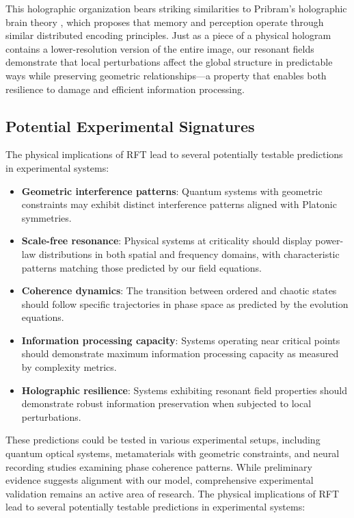 \documentclass[12pt,letterpaper]{article}
\begin{document}
This holographic organization bears striking similarities to Pribram's holographic brain theory \cite{pribram1991brain}, which proposes that memory and perception operate through similar distributed encoding principles. Just as a piece of a physical hologram contains a lower-resolution version of the entire image, our resonant fields demonstrate that local perturbations affect the global structure in predictable ways while preserving geometric relationships—a property that enables both resilience to damage and efficient information processing.

\vspace{2mm}
\subsection{Potential Experimental Signatures}
\label{subsec:experimental_signatures}

The physical implications of RFT lead to several potentially testable predictions in experimental systems:

\begin{itemize}
    \item \textbf{Geometric interference patterns}: Quantum systems with geometric constraints may exhibit distinct interference patterns aligned with Platonic symmetries.
    \item \textbf{Scale-free resonance}: Physical systems at criticality should display power-law distributions in both spatial and frequency domains, with characteristic patterns matching those predicted by our field equations.
    \item \textbf{Coherence dynamics}: The transition between ordered and chaotic states should follow specific trajectories in phase space as predicted by the evolution equations.
    \item \textbf{Information processing capacity}: Systems operating near critical points should demonstrate maximum information processing capacity as measured by complexity metrics.
    \item \textbf{Holographic resilience}: Systems exhibiting resonant field properties should demonstrate robust information preservation when subjected to local perturbations.
\end{itemize}

These predictions could be tested in various experimental setups, including quantum optical systems, metamaterials with geometric constraints, and neural recording studies examining phase coherence patterns. While preliminary evidence suggests alignment with our model, comprehensive experimental validation remains an active area of research.
The physical implications of RFT lead to several potentially testable predictions in experimental systems:
\end{document}
